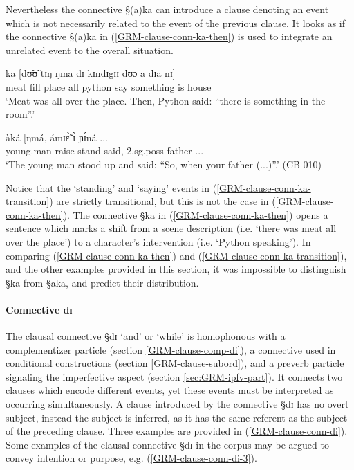Nevertheless the connective {\S (a)ka} can introduce a clause denoting an event
which is not necessarily related to the event of the previous clause. It looks
as if  the connective {\S (a)ka} in (\ref{GRM-clause-conn-ka-then}) is used to
integrate an unrelated event to  the overall situation.   

\begin{exe}
\ex\label{GRM-clause-conn-ka-then} 
 ka [dʊ̃ʊ̃ tɪŋ ŋma dɪ kɪndɪgɪɪ dʊɔ a dɪa nɪ]\\
{meat fill place all} {\conn} python {\art} say {\comp} something is  {\art}
house {\postp}\\
\glt `Meat was all over the place. Then,  Python said: ``there is something in
the room''.'
 \end{exe}

\begin{exe}
\ex\label{GRM-clause-conn-ka-transition} 
\gll  [à   	bìpɔ̀lɪ́ɪ̀   	sìì      	   tʃɪ́ŋá]     àká      
[ŋmá,  
ámɪɛ̃̀   ɪ̀               ɲɪ́ná  {...} \\
{\art} young.man      raise   stand {\conn} said,  {\adv}   {\sc 2.sg.poss} 
father  {...}\\
\glt `The young man stood up and said:  ``So, when your father (...)''.' (CB
010)
 \end{exe}

Notice that the `standing' and `saying' events in
(\ref{GRM-clause-conn-ka-transition}) are strictly transitional, but this is not
the case in (\ref{GRM-clause-conn-ka-then}). The connective {\S ka} in
(\ref{GRM-clause-conn-ka-then}) opens a sentence which marks a shift from a
scene description (i.e.  `there was meat all over the place') to a character's
intervention (i.e. `Python speaking').  In comparing
(\ref{GRM-clause-conn-ka-then}) and (\ref{GRM-clause-conn-ka-transition}), and
the other examples provided in this section, it was impossible to distinguish 
{\S ka} from   {\S aka}, and predict their  distribution.


\paragraph{Connective dɪ}
\label{GRM-clause-coord-di}
The clausal connective {\S dɪ} `and' or `while'  is homophonous with a
complementizer particle (section \ref{GRM-clause-comp-di}), a connective used in
conditional constructions (section \ref{GRM-clause-subord}),   and a preverb
particle signaling the imperfective aspect (section \ref{sec:GRM-ipfv-part}). It
connects two clauses which encode different events, yet these events must be
interpreted as occurring simultaneously.  A clause introduced by the connective
{\S dɪ} has no overt subject, instead the subject is inferred, as it has the
same referent as the subject of the preceding clause. Three examples are
provided in (\ref{GRM-clause-conn-di}). Some examples of the clausal connective
{\S dɪ} in the corpus may be argued to convey intention or purpose, e.g.
(\ref{GRM-clause-conn-di-3}). 

